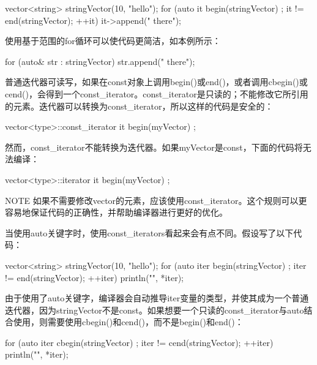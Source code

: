 \begin{cpp}
vector<string> stringVector(10, "hello");
for (auto it { begin(stringVector) }; it != end(stringVector); ++it) {
    it->append(" there");
}
\end{cpp}

使用基于范围的for循环可以使代码更简洁，如本例所示：

\begin{cpp}
for (auto& str : stringVector) {
    str.append(" there");
}
\end{cpp}


普通迭代器可读写，如果在const对象上调用begin()或end()，或者调用cbegin()或cend()，会得到一个const\_iterator。const\_iterator是只读的；不能修改它所引用的元素。迭代器可以转换为const\_iterator，所以这样的代码是安全的：

\begin{cpp}
vector<type>::const_iterator it { begin(myVector) };
\end{cpp}

然而，const\_iterator不能转换为迭代器。如果myVector是const，下面的代码将无法编译：

\begin{cpp}
vector<type>::iterator it { begin(myVector) };
\end{cpp}

\begin{myNotic}{NOTE}
如果不需要修改vector的元素，应该使用const\_iterator。这个规则可以更容易地保证代码的正确性，并帮助编译器进行更好的优化。
\end{myNotic}

当使用auto关键字时，使用const\_iterators看起来会有点不同。假设写了以下代码：

\begin{cpp}
vector<string> stringVector(10, "hello");
for (auto iter { begin(stringVector) }; iter != end(stringVector); ++iter) {
    println("{}", *iter);
}
\end{cpp}

由于使用了auto关键字，编译器会自动推导iter变量的类型，并使其成为一个普通迭代器，因为stringVector不是const。如果想要一个只读的const\_iterator与auto结合使用，则需要使用cbegin()和cend()，而不是begin()和end()：

\begin{cpp}
for (auto iter { cbegin(stringVector) }; iter != cend(stringVector); ++iter) {
    println("{}", *iter);
}
\end{cpp}

